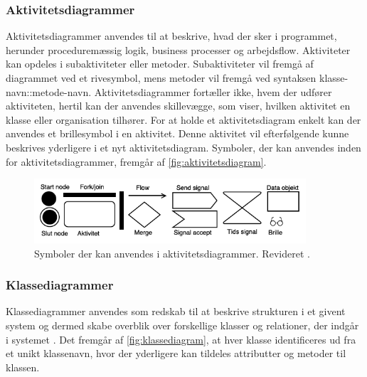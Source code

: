 \subsubsection{Aktivitetsdiagrammer} 
Aktivitetsdiagrammer anvendes til at beskrive, hvad der sker i programmet, herunder proceduremæssig logik, business processer og arbejdsflow. Aktiviteter kan opdeles i subaktiviteter eller metoder. Subaktiviteter vil fremgå af diagrammet ved et rivesymbol, mens metoder vil fremgå ved syntaksen klasse-navn::metode-navn. Aktivitetsdiagrammer fortæller ikke, hvem der udfører aktiviteten, hertil kan der anvendes skillevægge, som viser, hvilken aktivitet en klasse eller organisation tilhører. For at holde et aktivitetsdiagram enkelt kan der anvendes et brillesymbol i en aktivitet. Denne aktivitet vil efterfølgende kunne beskrives yderligere i et nyt aktivitetsdiagram.\cite{Fowler2004} Symboler, der kan anvendes inden for aktivitetsdiagrammer, fremgår af \autoref{fig:aktivitetsdiagram}.

\begin{figure} [H]
\centering
\includegraphics[width=0.9\textwidth]{figures/aktivitetsdiagram}
\caption{Symboler der kan anvendes i aktivitetsdiagrammer. Revideret \cite{Fowler2004}.}
\label{fig:aktivitetsdiagram}
\end{figure}




\subsubsection{Klassediagrammer}
Klassediagrammer anvendes som redskab til at beskrive strukturen i et givent system og dermed skabe overblik over forskellige klasser og relationer, der indgår i systemet \cite{Fowler2004}. Det fremgår af \autoref{fig:klassediagram}, at hver klasse identificeres ud fra et unikt klassenavn, hvor der yderligere kan tildeles attributter og metoder til klassen.


